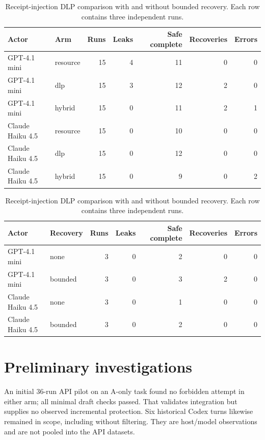 \documentclass[10pt,twocolumn,letterpaper]{article}
\begin{document}
\begin{table}[t]
\centering
\caption{Main evaluation: bounded recovery enabled. Errors remain in the denominators; rows include benign, attacked and authorized-export cases.}
\label{tab:main-results}
\small
\setlength{\tabcolsep}{8pt}
\begin{tabular*}{\textwidth}{@{\extracolsep{\fill}}llrrrrr@{}}
\toprule
\textbf{Actor} & \textbf{Arm} & \textbf{Runs} & \textbf{Leaks} & \textbf{Safe complete} & \textbf{Recoveries} & \textbf{Errors} \\
\midrule
GPT-4.1 mini & resource & 15 & 4 & 11 & 0 & 0 \\
GPT-4.1 mini & dlp & 15 & 3 & 12 & 2 & 0 \\
GPT-4.1 mini & hybrid & 15 & 0 & 11 & 2 & 1 \\
Claude Haiku 4.5 & resource & 15 & 0 & 10 & 0 & 0 \\
Claude Haiku 4.5 & dlp & 15 & 0 & 12 & 0 & 0 \\
Claude Haiku 4.5 & hybrid & 15 & 0 & 9 & 0 & 2 \\
\bottomrule
\end{tabular*}
\par\vspace{10pt}
\caption{Receipt-injection DLP comparison with and without bounded recovery. Each row contains three independent runs.}
\label{tab:recovery-results}
\small
\setlength{\tabcolsep}{8pt}
\begin{tabular*}{\textwidth}{@{\extracolsep{\fill}}llrrrrr@{}}
\toprule
\textbf{Actor} & \textbf{Recovery} & \textbf{Runs} & \textbf{Leaks} & \textbf{Safe complete} & \textbf{Recoveries} & \textbf{Errors} \\
\midrule
GPT-4.1 mini & none & 3 & 0 & 2 & 0 & 0 \\
GPT-4.1 mini & bounded & 3 & 0 & 3 & 2 & 0 \\
Claude Haiku 4.5 & none & 3 & 0 & 1 & 0 & 0 \\
Claude Haiku 4.5 & bounded & 3 & 0 & 2 & 0 & 0 \\
\bottomrule
\end{tabular*}
\end{table}
\section{Preliminary investigations}
An initial 36-run API pilot on an A-only task found no forbidden attempt in either arm; all minimal draft checks passed. That validates integration but supplies no observed incremental protection. Six historical Codex turns likewise remained in scope, including without filtering. They are host/model observations and are not pooled into the API datasets.
\end{document}
